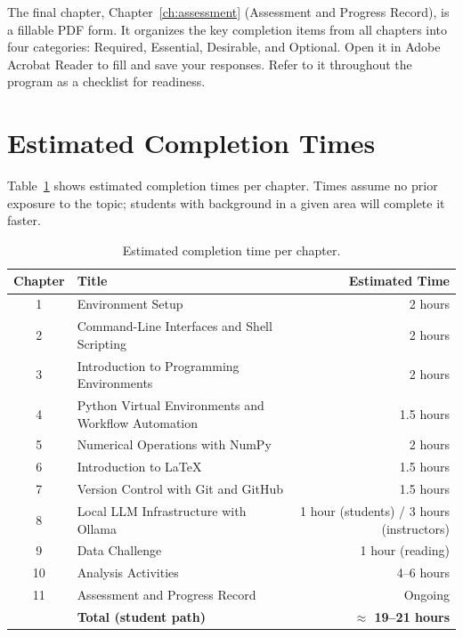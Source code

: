 \begin{landscape}
The final chapter, Chapter~\ref{ch:assessment} (Assessment and
Progress Record), is a fillable PDF form. It organizes the key
completion items from all chapters into four categories: Required,
Essential, Desirable, and Optional. Open it in Adobe Acrobat Reader
to fill and save your responses. Refer to it throughout the program
as a checklist for readiness.


\newpage
\section*{Estimated Completion Times}

Table~\ref{tab:times} shows estimated completion times per chapter.
Times assume no prior exposure to the topic; students with background
in a given area will complete it faster.

\begin{table}[htbp]
\centering
\caption{Estimated completion time per chapter.}
\label{tab:times}
\begin{tabular}{clr}
\toprule
\textbf{Chapter} & \textbf{Title} & \textbf{Estimated Time} \\
\midrule
1  & Environment Setup & 2 hours \\
2  & Command-Line Interfaces and Shell Scripting & 2 hours \\
3  & Introduction to Programming Environments & 2 hours \\
4  & Python Virtual Environments and Workflow Automation & 1.5 hours \\
5  & Numerical Operations with NumPy & 2 hours \\
6  & Introduction to \LaTeX{} & 1.5 hours \\
7  & Version Control with Git and GitHub & 1.5 hours \\
8  & Local LLM Infrastructure with Ollama & 1 hour (students) / 3 hours (instructors) \\
9  & Data Challenge & 1 hour (reading) \\
10 & Analysis Activities & 4--6 hours \\
11 & Assessment and Progress Record & Ongoing \\
\midrule
   & \textbf{Total (student path)} & \textbf{$\approx$ 19--21 hours} \\
\bottomrule
\end{tabular}
\end{table}

\end{landscape}

